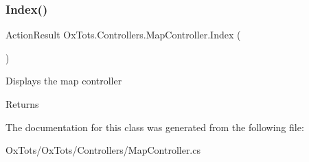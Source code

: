 \subsubsection{\texorpdfstring{Index()}{Index()}}
{\footnotesize\ttfamily Action\+Result Ox\+Tots.\+Controllers.\+Map\+Controller.\+Index (\begin{DoxyParamCaption}{ }\end{DoxyParamCaption})\hspace{0.3cm}{\ttfamily [inline]}}



Displays the map controller 

\begin{DoxyReturn}{Returns}

\end{DoxyReturn}


The documentation for this class was generated from the following file\+:\begin{DoxyCompactItemize}
\item 
Ox\+Tots/\+Ox\+Tots/\+Controllers/Map\+Controller.\+cs\end{DoxyCompactItemize}
